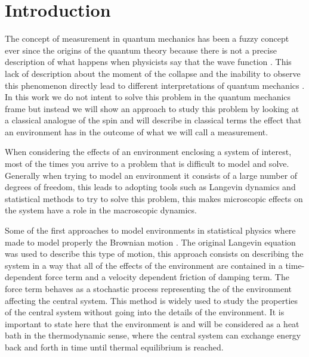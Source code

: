\chapter{Introduction}

The concept of measurement in quantum mechanics has been a fuzzy concept ever since the origins of the quantum theory because there is not a precise description of what happens when physicists say that the wave function . This lack of description about the moment of the collapse and the inability to observe this phenomenon directly lead to different interpretations of quantum mechanics \cite{schlosshauer2005decoherence}. In this work we do not intent to solve this problem in the quantum mechanics frame but instead we will show an approach to study this problem by looking at a classical analogue of the spin and will describe in classical terms the effect that an environment has in the outcome of what we will call a measurement. \par

When considering the effects of an environment enclosing a system of interest, most of the times you arrive to a problem that is difficult to model and solve. Generally when trying to model an environment it consists of a large number of degrees of freedom, this leads to adopting tools such as Langevin dynamics and statistical methods to try to solve this problem, this makes microscopic effects on the system have a role in the macroscopic dynamics.\par 

Some of the first approaches to model environments in statistical physics where made to model properly the Brownian motion \cite{brown1828philosophical}\cite{einstein1905motion}\cite{kubo1986brownian}. The original Langevin equation \cite{langevin1908theorie} was used to describe this type of motion, this approach consists on describing the system in a way that all of the effects of the environment are contained in a time-dependent force term and a velocity dependent friction of damping term. The force term behaves as a stochastic process representing the  of the environment affecting the central system. This method is widely used to study the properties of the central system without going into the details of the environment. It is important to state here that the environment is and will be  considered as a heat bath in the thermodynamic sense, where the central system can exchange energy back and forth in time until thermal equilibrium is reached.\par 

